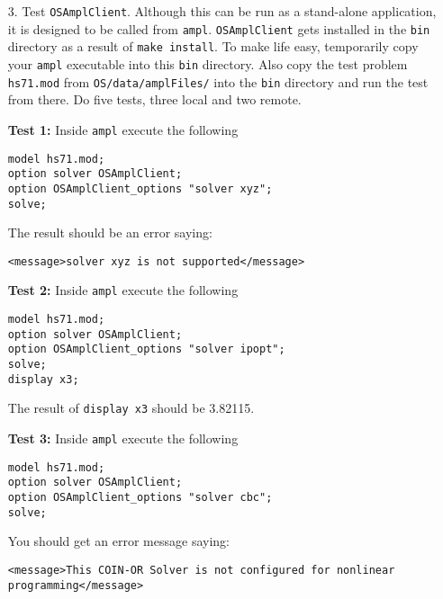 \begin{itemize}
\begin{itemize}
{\bf IMPORTANT:}  Please do NOT commit the changes to these config files. 

 \end{itemize}


 
 \item[3.]  Test {\tt OSAmplClient}.  Although this can be run as a stand-alone application, it is designed to be called from  {\tt ampl}.  
 {\tt OSAmplClient}   gets installed in the {\tt bin} directory as a result of {\tt make install}. To make life easy, temporarily copy your {\tt ampl} executable into this {\tt bin} directory.   Also copy the test problem {\tt hs71.mod}  from {\tt OS/data/amplFiles/} into the {\tt bin} directory and run the test from there.   Do five tests, three local and two remote.
 
 
 \vskip 10pt
 
 
 {\bf Test 1:}  Inside  {\tt ampl} execute the following
 


\begin{verbatim}
model hs71.mod;
option solver OSAmplClient;
option OSAmplClient_options "solver xyz";
solve;
\end{verbatim}

The result should be an error saying:
\begin{verbatim}
<message>solver xyz is not supported</message>
\end{verbatim}
 
 \vskip 10pt
 
 {\bf Test 2:}  Inside  {\tt ampl} execute the following
 
\begin{verbatim}
model hs71.mod;
option solver OSAmplClient;
option OSAmplClient_options "solver ipopt";
solve;
display x3;
\end{verbatim}

The result of {\tt display x3} should be 3.82115. 


 \vskip 10pt
 
 {\bf Test 3:}  Inside  {\tt ampl} execute the following
 
\begin{verbatim}
model hs71.mod;
option solver OSAmplClient;
option OSAmplClient_options "solver cbc";
solve;
\end{verbatim}

You should get an error message saying:
\begin{verbatim}
<message>This COIN-OR Solver is not configured for nonlinear programming</message>
\end{verbatim}



\end{itemize}
